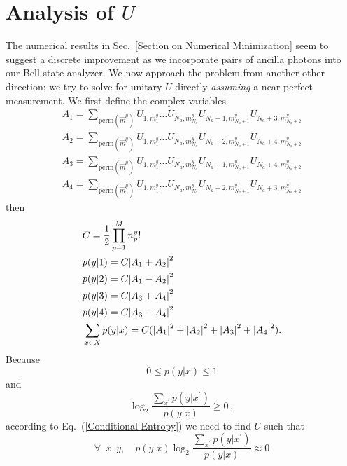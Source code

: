 \documentclass[aps,pra,twocolumn,showpacs,superscriptaddress,floatfix,10pt]{revtex4}
\begin{document}
\section{Analysis of $U$}
\label{Section on U Analysis}
The numerical results in Sec.~\ref{Section on Numerical Minimization} seem to suggest a discrete improvement as we incorporate pairs of ancilla photons into our Bell state analyzer. We now approach the problem from another other direction; we try to solve for unitary $U$ directly \textit{assuming} a near-perfect measurement.
We first define the complex variables
\begin{eqnarray}
	 A_1 = \sum\limits_{\textrm{perm}(\vec{m}^y)} U_{1,m^y_1} \dots U_{N_a,m^y_{N_a}} U_{N_a+1,m^y_{N_a+1}} U_{N_a+3,m^y_{N_a+2}} \nonumber\\
	 A_2 = \sum\limits_{\textrm{perm}(\vec{m}^y)} U_{1,m^y_1} \dots U_{N_a,m^y_{N_a}} U_{N_a+2,m^y_{N_a+1}} U_{N_a+4,m^y_{N_a+2}} \nonumber\\
	 A_3 = \sum\limits_{\textrm{perm}(\vec{m}^y)} U_{1,m^y_1} \dots U_{N_a,m^y_{N_a}} U_{N_a+1,m^y_{N_a+1}} U_{N_a+4,m^y_{N_a+2}} \nonumber\\
	 A_4 = \sum\limits_{\textrm{perm}(\vec{m}^y)} U_{1,m^y_1} \dots U_{N_a,m^y_{N_a}} U_{N_a+2,m^y_{N_a+1}} U_{N_a+3,m^y_{N_a+2}} \nonumber
\end{eqnarray}
then
\begin{eqnarray}
	& C = \frac{1}{2}\prod_{p=1}^{M} n^y_p! \nonumber \\
	& p(y|1) = C \abs{A_1 + A_2}^2\nonumber \\
	& p(y|2) = C \abs{A_1 - A_2}^2 \\
	& p(y|3) = C \abs{A_3 + A_4}^2 \nonumber\\
	& p(y|4) = C \abs{A_3 - A_4}^2 \nonumber\\
	& \sum_{x \in X} p(y|x) = C(\abs{A_1}^2 + \abs{A_2}^2 + \abs{A_3}^2 + \abs{A_4}^2 ). \nonumber
\end{eqnarray}
Because 
\begin{equation}
	0 \le p(y|x) \le 1
\end{equation}
and
\begin{equation}
	\log_2 \frac{\sum_{x^\prime} p(y|x^\prime)}{p(y|x)} \ge 0 \,,
\end{equation}
according to Eq.~(\ref{Conditional Entropy}) we need to find $U$ such that
\begin{equation}
\label{Conditional Entropy Condition}
	\forall \enspace x \enspace y , \quad p(y|x) \log_2 \frac{\sum_{x^\prime} p(y|x^\prime)}{p(y|x)} \approx 0
\end{equation}
\end{document}
